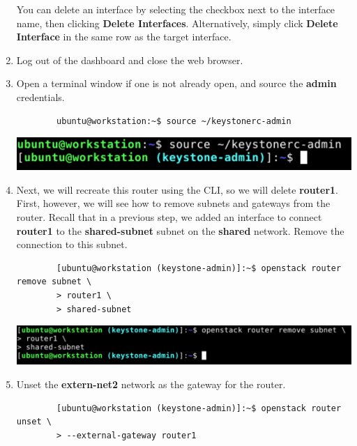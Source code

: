 \documentclass[letterpaper, 12pt]{article}
\begin{document}
\begin{enumerate}
    \begin{tipbox}
        You can delete an interface by selecting the checkbox next to the interface name, then clicking \textbf{Delete Interfaces}.
        Alternatively, simply click \textbf{Delete Interface} in the same row as the target interface.
    \end{tipbox}

    \item Log out of the dashboard and close the web browser.

    \item Open a terminal window if one is not already open, and source the \textbf{admin} credentials.
    \begin{lstlisting}
        ubuntu@workstation:~$ source ~/keystonerc-admin
    \end{lstlisting}

    \begin{center}
        \includegraphics[width=\linewidth]{images/part2/step8.png}
    \end{center}

    \item Next, we will recreate this router using the CLI, so we will delete \textbf{router1}.
    First, however, we will see how to remove subnets and gateways from the router.
    Recall that in a previous step, we added an interface to connect \textbf{router1} to the \textbf{shared-subnet} subnet on the \textbf{shared} network.
    Remove the connection to this subnet.
    \begin{lstlisting}
        [ubuntu@workstation (keystone-admin)]:~$ openstack router remove subnet \
        > router1 \
        > shared-subnet
    \end{lstlisting}

    \begin{center}
        \includegraphics[width=\linewidth]{images/part2/step9.png}
    \end{center}

    \item Unset the \textbf{extern-net2} network as the gateway for the router.
    \begin{lstlisting}
        [ubuntu@workstation (keystone-admin)]:~$ openstack router unset \
        > --external-gateway router1
    \end{lstlisting}


\end{enumerate}
\end{document}
